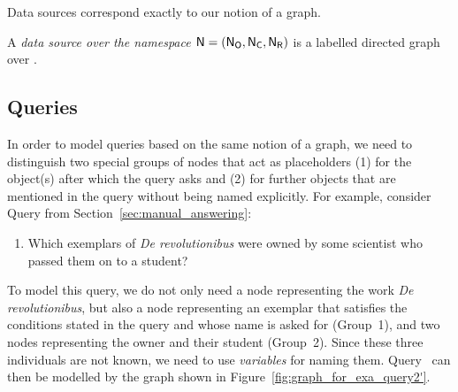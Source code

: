 Data sources correspond exactly to our notion of a graph.
%
\begin{definition}
  \label{def:data_source}
  A \emph{data source over the namespace $\textup{\textsf{N}}=(\mathsf{N}_\mathsf{O},\mathsf{N}_\mathsf{C},\mathsf{N}_\mathsf{R})$} is a labelled directed graph
  over \namespace.
\end{definition}
%
%
\subsection{Queries}

In order to model queries based on the same notion of a graph, we need to distinguish
two special groups of nodes that act as placeholders (1) for the object(s) after which the query asks
and (2) for further objects that are mentioned in the query without being named explicitly.
For example, consider Query  from Section~\ref{sec:manual_answering}:
%
\begin{enumerate}
  \item[\exaquery{2$'$}]
    Which exemplars of \emph{De revolutionibus} were owned by some scientist who passed them on to a student?
\end{enumerate}
%
To model this query, we do not only need a node representing the work \emph{De revolutionibus},
but also a node representing an exemplar that satisfies the conditions stated in the query and whose name is asked for (Group~1),
and two nodes representing the owner and their student (Group~2).
Since these three individuals are not known, we need to use \emph{variables} for naming them.
Query~
can then be modelled by the graph shown in Figure~\ref{fig:graph_for_exa_query2'}.

